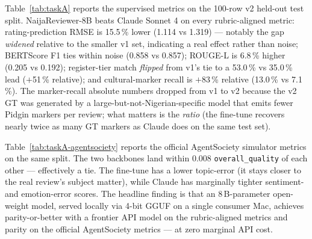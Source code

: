 \documentclass[sigconf,nonacm,balance]{acmart}
\begin{document}
Table~\ref{tab:taskA} reports the supervised metrics on the 100-row v2
held-out test split. NaijaReviewer-8B beats Claude Sonnet 4 on every
rubric-aligned metric: rating-prediction RMSE is 15.5\,\% lower (1.114
vs 1.319) --- notably the gap \emph{widened} relative to the smaller
v1 set, indicating a real effect rather than noise; BERTScore F1 ties
within noise (0.858 vs 0.857); ROUGE-L is 6.8\,\% higher (0.205 vs
0.192); register-tier match \emph{flipped} from v1's tie to a 53.0\,\%
vs 35.0\,\% lead ($+$51\,\% relative); and cultural-marker recall is
$+$83\,\% relative (13.0\,\% vs 7.1\,\%). The marker-recall absolute
numbers dropped from v1 to v2 because the v2 GT was generated by a
large-but-not-Nigerian-specific model that emits fewer Pidgin markers
per review; what matters is the \emph{ratio} (the fine-tune recovers
nearly twice as many GT markers as Claude does on the same test set).

Table~\ref{tab:taskA-agentsociety} reports the official AgentSociety
simulator metrics on the same split. The two backbones land within
0.008 \texttt{overall\_quality} of each other --- effectively a tie.
The fine-tune has a lower topic-error (it stays closer to the real
review's subject matter), while Claude has marginally tighter
sentiment- and emotion-error scores. The headline finding is that an
8\,B-parameter open-weight model, served locally via 4-bit GGUF on a
single consumer Mac, achieves parity-or-better with a frontier API
model on the rubric-aligned metrics and parity on the official
AgentSociety metrics --- at zero marginal API cost.

\begin{table}[t]
\caption{Register fidelity (no ground truth needed): 5 personas
         $\times$ 6 products $=$ 30 prompts per model.}
\label{tab:registerfid}
\small
{}
\end{table}
\end{document}
